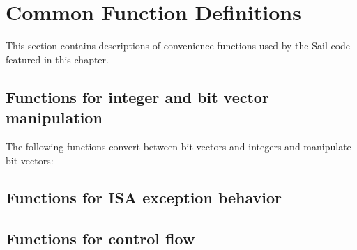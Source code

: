 \section{Common Function Definitions}

This section contains descriptions of convenience functions used by the Sail code featured in this chapter.

\subsection*{Functions for integer and bit vector manipulation}
\label{sec:sail-int-and-bitvector-functions}

The following functions convert between bit vectors and integers and manipulate bit vectors:

\medskip
{}


\label{sailMIPSzzzerozyextend}

\label{sailMIPSzsignzyextend}

\label{sailMIPSzzzeros}

\label{sailMIPSzzones}

\subsection*{Functions for ISA exception behavior}


\subsection*{Functions for control flow}

